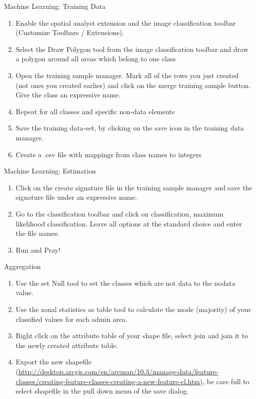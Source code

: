 \begin{frame}{Machine Learning: Training Data}
	\begin{enumerate}
		\item Enable the spatial analyst extension and the image classification toolbar (Customize \textrightarrow Toolbars / Extensions).
		\item Select the Draw Polygon tool from the image classification toolbar and draw a polygon around all areas which belong to one class
		\item Open the training sample manager. Mark all of the rows you just created (not ones you created earlier) and click on the merge training sample button. Give the class an expressive name.
		\item Repeat for all classes and specific non-data elements
		\item Save the training data-set, by clicking on the save icon in the training data manager.
		\item Create a .csv file with mappings from class names to integers
	\end{enumerate}
\end{frame}

\begin{frame}{Machine Learning: Estimation}
	\begin{enumerate}
		\item Click on the create signature file in the training sample manager and save the signature file under an expressive name.
		\item Go to the classification toolbar and click on classification, maximum likelihood classification. Leave all options at the standard choice and enter the file names.
		\item Run and Pray!
	\end{enumerate}
\end{frame}

\begin{frame}{Aggregation}
	\begin{enumerate}
		\item Use the set Null tool to set the classes which are not data to the nodata value.
		\item Use the zonal statistics as table tool to calculate the mode (majority) of your classified values for each admin area.
		\item Right click on the attribute table of your shape file, select join and join it to the newly created attribute table.
		\item Export the new shapefile (\url{http://desktop.arcgis.com/en/arcmap/10.3/manage-data/feature-classes/creating-feature-classes-creating-a-new-feature-cl.htm}), be care full to select shapefile in the pull down menu of the save dialog.
	\end{enumerate}
\end{frame} 

